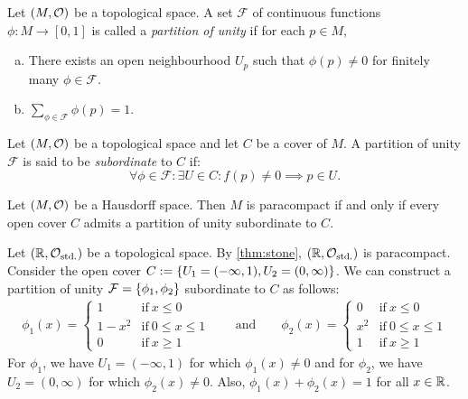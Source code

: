 \begin{definition}\label{def:partition_of_unity}
	Let \((M, \mathcal{O})\) be a topological space. A set \(\mathcal{F}\) of continuous functions \(\phi: M \to [0, 1]\) is called a \emph{partition of unity} if for each \(p \in M\),
	\begin{enumerate}[(a)]
		\item There exists an open neighbourhood \(U_p\) such that \(\phi(p) \ne 0\) for finitely many \(\phi \in \mathcal{F}\).
		\item \(\sum\limits_{\phi \in \mathcal{F}} \phi(p) = 1\).
	\end{enumerate}
\end{definition}

\begin{definition}\label{def:partition_of_unity_subordinate}
	Let \((M, \mathcal{O})\) be a topological space and let \(C\) be a cover of \(M\). A partition of unity \(\mathcal{F}\) is said to be \emph{subordinate} to \(C\) if:
	\begin{equation}
		\forall \phi \in \mathcal{F}: \exists U \in C: f(p) \ne 0 \implies p \in U. \label{eq:partition_of_unity_subordinate}
	\end{equation}
\end{definition}

\begin{theorem}
	Let \((M, \mathcal{O})\) be a Hausdorff space. Then \(M\) is paracompact if and only if every open cover \(C\) admits a partition of unity subordinate to \(C\).
\end{theorem}

\begin{example}
	Let \((\mathbb R, \mathcal{O}_{\text{std.}})\) be a topological space. By \cref{thm:stone}, \((\mathbb R, \mathcal{O}_{\text{std.}})\) is paracompact. Consider the open cover \(C := \qty{U_1 = (-\infty, 1), U_2 = (0, \infty)}\). We can construct a partition of unity \(\mathcal{F} = \qty{\phi_1, \phi_2}\) subordinate to \(C\) as follows:
	\begin{align*}
		\phi_1(x) = \begin{cases}
			            1       & \text{if}\ x \le 0       \\
			            1 - x^2 & \text{if}\ 0 \le x \le 1 \\
			            0       & \text{if}\ x \ge 1
		            \end{cases} \qquad \text{and} \qquad
		\phi_2(x) = \begin{cases}
			            0   & \text{if}\ x \le 0       \\
			            x^2 & \text{if}\ 0 \le x \le 1 \\
			            1   & \text{if}\ x \ge 1
		            \end{cases}
	\end{align*}
	For \(\phi_1\), we have \(U_1 = (-\infty, 1)\) for which \(\phi_1(x) \ne 0\) and for \(\phi_2\), we have \(U_2 = (0, \infty)\) for which \(\phi_2(x) \ne 0\). Also, \(\phi_1(x) + \phi_2(x) = 1\) for all \(x \in \mathbb R\).
\end{example}

